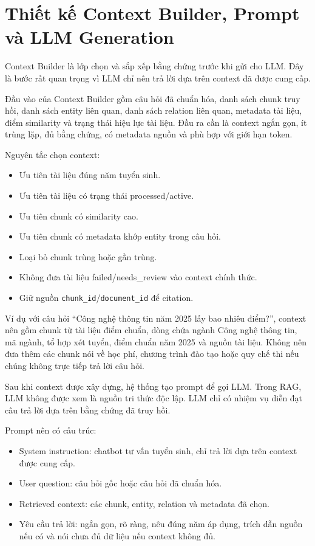 \documentclass[12pt,a4paper]{report}
\begin{document}
\section{Thiết kế Context Builder, Prompt và LLM Generation}

Context Builder là lớp chọn và sắp xếp bằng chứng trước khi gửi cho LLM. Đây là bước rất quan trọng vì LLM chỉ nên trả lời dựa trên context đã được cung cấp.

Đầu vào của Context Builder gồm câu hỏi đã chuẩn hóa, danh sách chunk truy hồi, danh sách entity liên quan, danh sách relation liên quan, metadata tài liệu, điểm similarity và trạng thái hiệu lực tài liệu. Đầu ra cần là context ngắn gọn, ít trùng lặp, đủ bằng chứng, có metadata nguồn và phù hợp với giới hạn token.

Nguyên tắc chọn context:

\begin{itemize}
    \item Ưu tiên tài liệu đúng năm tuyển sinh.
    \item Ưu tiên tài liệu có trạng thái processed/active.
    \item Ưu tiên chunk có similarity cao.
    \item Ưu tiên chunk có metadata khớp entity trong câu hỏi.
    \item Loại bỏ chunk trùng hoặc gần trùng.
    \item Không đưa tài liệu failed/needs\_review vào context chính thức.
    \item Giữ nguồn \texttt{chunk\_id}/\texttt{document\_id} để citation.
\end{itemize}

Ví dụ với câu hỏi ``Công nghệ thông tin năm 2025 lấy bao nhiêu điểm?'', context nên gồm chunk từ tài liệu điểm chuẩn, dòng chứa ngành Công nghệ thông tin, mã ngành, tổ hợp xét tuyển, điểm chuẩn năm 2025 và nguồn tài liệu. Không nên đưa thêm các chunk nói về học phí, chương trình đào tạo hoặc quy chế thi nếu chúng không trực tiếp trả lời câu hỏi.

Sau khi context được xây dựng, hệ thống tạo prompt để gọi LLM. Trong RAG, LLM không được xem là nguồn tri thức độc lập. LLM chỉ có nhiệm vụ diễn đạt câu trả lời dựa trên bằng chứng đã truy hồi.

Prompt nên có cấu trúc:

\begin{itemize}
    \item System instruction: chatbot tư vấn tuyển sinh, chỉ trả lời dựa trên context được cung cấp.
    \item User question: câu hỏi gốc hoặc câu hỏi đã chuẩn hóa.
    \item Retrieved context: các chunk, entity, relation và metadata đã chọn.
    \item Yêu cầu trả lời: ngắn gọn, rõ ràng, nêu đúng năm áp dụng, trích dẫn nguồn nếu có và nói chưa đủ dữ liệu nếu context không đủ.
\end{itemize}
\end{document}
